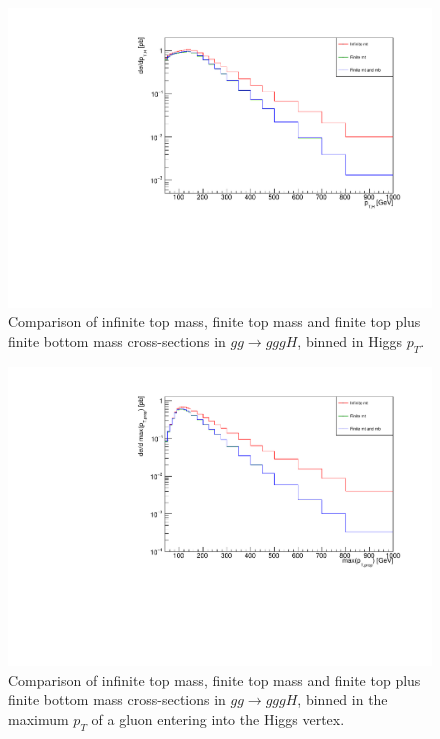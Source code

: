 \begin{figure}[H]
\centering
\includegraphics[scale=0.72]{Images/ptH_3j.pdf}
\caption{Comparison of infinite top mass, finite top mass and finite top plus finite bottom mass cross-sections in $gg \to gggH$, binned in Higgs $p_T$. }
\label{fig:pth_gg_gggH}
\end{figure}

\begin{figure}[H]
\centering
\includegraphics[scale=0.72]{Images/largestproppt.pdf}
\caption{Comparison of infinite top mass, finite top mass and finite top plus finite bottom mass cross-sections in $gg \to gggH$, binned in the maximum $p_T$ of a gluon entering into the Higgs vertex. }
\label{fig:maxprop}
\end{figure}

